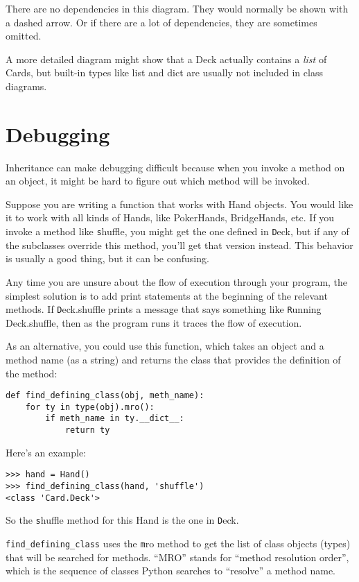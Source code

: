 \documentclass[
DIV=11,
fontsize=13,
twoside,
headinclude=false,
titlepage=firstiscover,
abstract=true,
headsepline=true,
footsepline=true,
chapterprefix=true, %
headings=big,
bibliography=totoc,%
captions=tableheading
]{scrbook}
\theoremstyle{definition}
\begin{document}
There are no dependencies in this diagram.  They would normally
be shown with a dashed arrow.  Or if there are a lot of
dependencies, they are sometimes omitted.

A more detailed diagram might show that a Deck actually
contains a {\em list} of Cards, but built-in types
like list and dict are usually not included in class diagrams.


\section{Debugging}

Inheritance can make debugging difficult because when you invoke a
method on an object, it might be hard to figure out which method will
be invoked.  

Suppose you are writing a function that works with Hand objects.
You would like it to work with all kinds of Hands, like
PokerHands, BridgeHands, etc.  If you invoke a method like
{\texttt shuffle}, you might get the one defined in {\texttt Deck},
but if any of the subclasses override this method, you'll
get that version instead.  This behavior is usually a good
thing, but it can be confusing.

Any time you are unsure about the flow of execution through your
program, the simplest solution is to add print statements at the
beginning of the relevant methods.  If {\texttt Deck.shuffle} prints a
message that says something like {\texttt Running Deck.shuffle}, then as
the program runs it traces the flow of execution.

As an alternative, you could use this function, which takes an
object and a method name (as a string) and returns the class that
provides the definition of the method:

\begin{lstlisting}
def find_defining_class(obj, meth_name):
    for ty in type(obj).mro():
        if meth_name in ty.__dict__:
            return ty
\end{lstlisting}
%
Here's an example:

\begin{lstlisting}
>>> hand = Hand()
>>> find_defining_class(hand, 'shuffle')
<class 'Card.Deck'>
\end{lstlisting}
%
So the {\texttt shuffle} method for this Hand is the one in {\texttt Deck}.

\verb"find_defining_class" uses the {\texttt mro} method to get the list
of class objects (types) that will be searched for methods.  ``MRO''
stands for ``method resolution order'', which is the sequence of
classes Python searches to ``resolve'' a method name.
\end{document}
